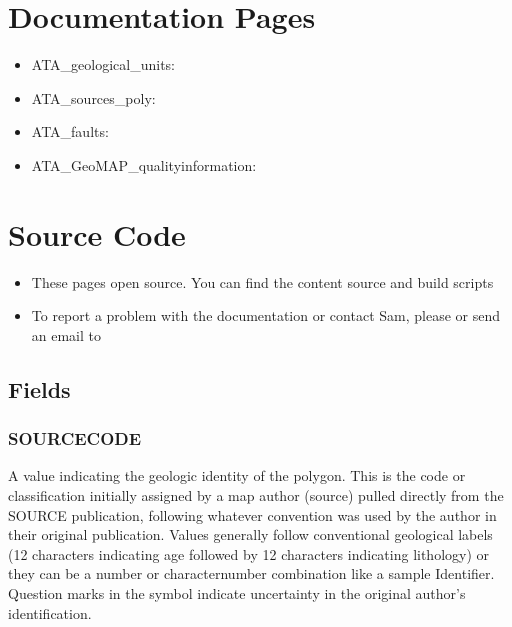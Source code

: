 \documentclass[letterpaper,10pt,english]{sphinxmanual}
\begin{document}
\chapter{Documentation Pages}
\label{\detokenize{index:documentation-pages}}\begin{itemize}
\item {} 
ATA\_geological\_units: {\hyperref[\detokenize{field_glossary::doc}]{}}

\item {} 
ATA\_sources\_poly: 

\item {} 
ATA\_faults: 

\item {} 
ATA\_GeoMAP\_qualityinformation: 

\end{itemize}


\chapter{Source Code}
\label{\detokenize{index:source-code}}\begin{itemize}
\item {} 
These pages open source. You can find the content source and build scripts 

\item {} 
To report a problem with the documentation or contact Sam, please  or send an email to 

\end{itemize}


\section{Fields}
\label{\detokenize{field_glossary:fields}}\label{\detokenize{field_glossary::doc}}

\subsection{SOURCECODE}
\label{\detokenize{field_glossary:sourcecode}}
A value indicating the geologic identity of the polygon. This is the code or classification initially assigned by a map author (source) pulled directly from the SOURCE publication, following whatever convention was used by the author in their original publication. Values generally follow conventional geological labels (1\sphinxhyphen{}2 characters indicating age followed by 1\sphinxhyphen{}2 characters indicating lithology) or they can be a number or character\sphinxhyphen{}number combination like a sample Identifier. Question marks in the symbol indicate uncertainty in the original author’s identification.
\end{document}
